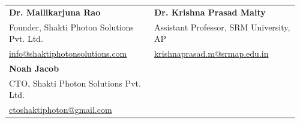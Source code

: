 \documentclass[a4paper,10pt]{article}
\begin{document}
\begin{tabular}{@{}p{0.48\linewidth}p{0.48\linewidth}@{}}
\textbf{Dr. Mallikarjuna Rao} & \textbf{Dr. Krishna Prasad Maity} \\
Founder, Shakti Photon Solutions Pvt. Ltd. & Assistant Professor, SRM University, AP \\
\href{mailto:info@shaktiphotonsolutions.com}{info@shaktiphotonsolutions.com} & \href{mailto:krishnaprasad.m@srmap.edu.in}{krishnaprasad.m@srmap.edu.in} \\[0.5em]

\textbf{Noah Jacob} \\
CTO, Shakti Photon Solutions Pvt. Ltd. \\
\href{mailto:ctoshaktiphoton@gmail.com}{ctoshaktiphoton@gmail.com}

\end{tabular}
\end{document}
